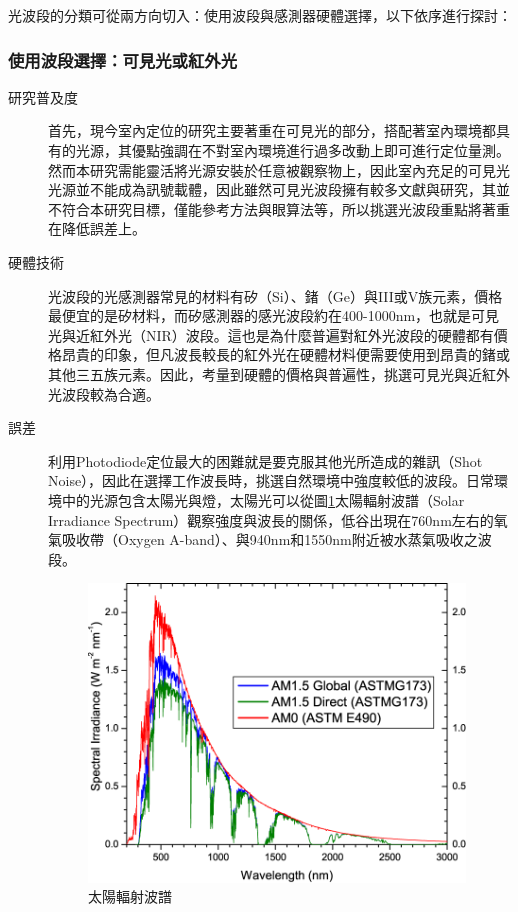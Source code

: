         光波段的分類可從兩方向切入：使用波段與感測器硬體選擇，以下依序進行探討：

        \subsubsection{使用波段選擇：可見光或紅外光}

        \begin{description}
        \item[研究普及度]\hfill 

        首先，現今室內定位的研究主要著重在可見光的部分\cite{survey_light2018}，搭配著室內環境都具有的光源，其優點強調在不對室內環境進行過多改動上即可進行定位量測。然而本研究需能靈活將光源安裝於任意被觀察物上，因此室內充足的可見光光源並不能成為訊號載體，因此雖然可見光波段擁有較多文獻與研究，其並不符合本研究目標，僅能參考方法與眼算法等，所以挑選光波段重點將著重在降低誤差上。

        \item[硬體技術] \hfill 
        
        光波段的光感測器常見的材料有矽（Si）、鍺（Ge）與III或V族元素，價格最便宜的是矽材料，而矽感測器的感光波段約在400-1000nm，也就是可見光與近紅外光（NIR）波段。這也是為什麼普遍對紅外光波段的硬體都有價格昂貴的印象，但凡波長較長的紅外光在硬體材料便需要使用到昂貴的鍺或其他三五族元素\cite{si_pd}。因此，考量到硬體的價格與普遍性，挑選可見光與近紅外光波段較為合適。

        \item[誤差] \hfill 
        
        利用Photodiode定位最大的困難就是要克服其他光所造成的雜訊（Shot Noise），因此在選擇工作波長時，挑選自然環境中強度較低的波段。日常環境中的光源包含太陽光與燈，太陽光可以從圖\ref{pic:solar_spectrum}太陽輻射波譜（Solar Irradiance Spectrum）觀察強度與波長的關係，低谷出現在760nm左右的氧氣吸收帶（Oxygen A-band）、與940nm和1550nm附近被水蒸氣吸收之波段\cite{book:solar_spectrum}。

        \begin{figure}[ht]
            \centering
            \includegraphics[width=10cm]{ch2pic/solar_spectra.png}
            \caption{太陽輻射波譜\cite{astm}}
            \label{pic:solar_spectrum}
        \end{figure}


\end{description}
